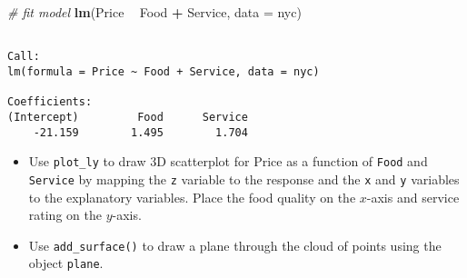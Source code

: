 \documentclass[
]{book}
\newenvironment{Shaded}{\begin{snugshade}}{\end{snugshade}}
\newcommand{\CommentTok}[1]{\textcolor[rgb]{0.56,0.35,0.01}{\textit{#1}}}
\newcommand{\DataTypeTok}[1]{\textcolor[rgb]{0.13,0.29,0.53}{#1}}
\newcommand{\FloatTok}[1]{\textcolor[rgb]{0.00,0.00,0.81}{#1}}
\newcommand{\KeywordTok}[1]{\textcolor[rgb]{0.13,0.29,0.53}{\textbf{#1}}}
\newcommand{\NormalTok}[1]{#1}
\newcommand{\OperatorTok}[1]{\textcolor[rgb]{0.81,0.36,0.00}{\textbf{#1}}}
\newcommand{\OtherTok}[1]{\textcolor[rgb]{0.56,0.35,0.01}{#1}}
\newcommand{\StringTok}[1]{\textcolor[rgb]{0.31,0.60,0.02}{#1}}
\providecommand{\tightlist}{%
  \setlength{\itemsep}{0pt}\setlength{\parskip}{0pt}}
\begin{document}
\begin{Shaded}
\begin{Highlighting}[]
\CommentTok{# fit model}
\KeywordTok{lm}\NormalTok{(Price }\OperatorTok{~}\StringTok{ }\NormalTok{Food }\OperatorTok{+}\StringTok{ }\NormalTok{Service, }\DataTypeTok{data =}\NormalTok{ nyc)}
\end{Highlighting}
\end{Shaded}

\begin{verbatim}

Call:
lm(formula = Price ~ Food + Service, data = nyc)

Coefficients:
(Intercept)         Food      Service  
    -21.159        1.495        1.704  
\end{verbatim}

\begin{itemize}
\tightlist
\item
  Use \texttt{plot\_ly} to draw 3D scatterplot for Price as a function of \texttt{Food} and \texttt{Service} by mapping the \texttt{z} variable to the response and the \texttt{x} and \texttt{y} variables to the explanatory variables. Place the food quality on the \(x\)-axis and service rating on the \(y\)-axis.
\end{itemize}

\begin{Shaded}
\end{Shaded}

\begin{itemize}
\tightlist
\item
  Use \texttt{add\_surface()} to draw a plane through the cloud of points using the object \texttt{plane}.
\end{itemize}

\begin{Shaded}
\end{Shaded}
\end{document}
